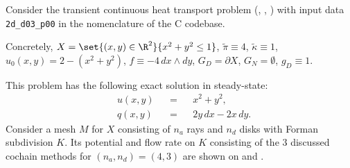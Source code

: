\begin{example}
  \label{cmc/diffusion/continuous/transient/examples/2d_d03_p00-example}
  Consider the transient continuous heat transport problem
  (,
   ,
   )
  with input data \verb|2d_d03_p00| in the nomenclature of the C codebase.

  Concretely,
    $X = \set{(x, y) \in \R^2}{x^2 + y^2 \leq 1}$,
    $\tilde{\pi} \equiv 4$,
    $\tilde{\kappa} \equiv 1$,
    $u_0(x, y) = 2 - (x^2 + y^2)$,
    $f \equiv -4\, d x \wedge d y$,
    $G_D = \partial X$,
    $G_N = \emptyset$,
    $g_D \equiv 1$.

  This problem has the following exact solution in steady-state:
  \begin{subequations}
    \begin{alignat}{3}
      & u(x, y) && = && x^2 + y^2, \\
      & q(x, y) && = && 2 y\, d x - 2 x\, d y.
    \end{alignat}
  \end{subequations}
  Consider a mesh $M$ for $X$ consisting of $n_a$ rays and $n_d$ disks
  with Forman subdivision $K$.
  Its potential and flow rate on $K$ consisting of the $3$ discussed cochain
  methods for $(n_a, n_d) = (4, 3)$ are shown on
  and
  .
\end{example}
